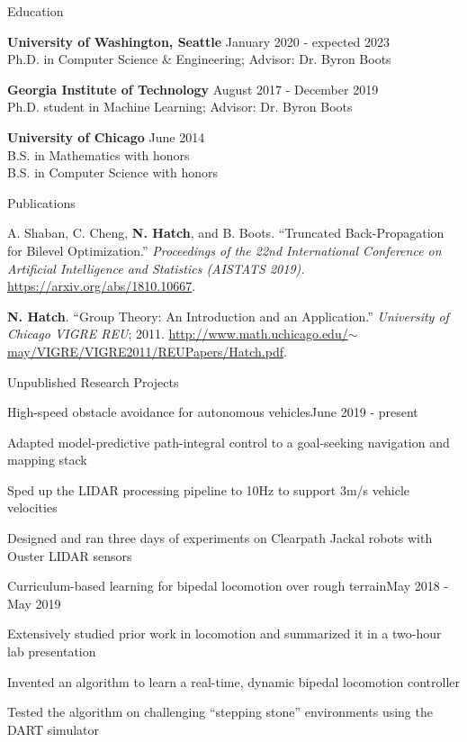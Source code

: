 \documentclass{resume} %
\begin{document}
\begin{rSection}{Education}

{\bf University of Washington, Seattle} \hfill {January 2020 - expected 2023} \\
Ph.D. in Computer Science \& Engineering; Advisor: Dr. Byron Boots

{\bf Georgia Institute of Technology} \hfill {August 2017 - December 2019} \\
Ph.D. student in Machine Learning; Advisor: Dr. Byron Boots

{\bf University of Chicago} \hfill {June 2014} \\
B.S. in Mathematics with honors \\
B.S. in Computer Science with honors

\end{rSection}

\begin{rSection}{Publications}

A. Shaban, C. Cheng, {\bf N. Hatch}, and B. Boots. ``Truncated Back-Propagation for Bilevel Optimization.''
{\em Proceedings of the 22nd International Conference on Artificial Intelligence and Statistics (AISTATS 2019).}
\href{https://arxiv.org/abs/1810.10667}{https://arxiv.org/abs/1810.10667}.

{\bf N. Hatch}. ``Group Theory: An Introduction and an Application.'' {\em University of Chicago VIGRE REU}; 2011.
\href{http://www.math.uchicago.edu/~may/VIGRE/VIGRE2011/REUPapers/Hatch.pdf}{http://www.math.uchicago.edu/$\sim$may/VIGRE/VIGRE2011/REUPapers/Hatch.pdf}.

\end{rSection}

\begin{rSection}{Unpublished Research Projects}

\begin{rProject}{High-speed obstacle avoidance for autonomous vehicles}{June 2019 - present}
\item Adapted model-predictive path-integral control to a goal-seeking navigation and mapping stack
\item Sped up the LIDAR processing pipeline to 10Hz to support 3m/s vehicle velocities
\item Designed and ran three days of experiments on Clearpath Jackal robots with Ouster LIDAR sensors
\end{rProject}

\begin{rProject}{Curriculum-based learning for bipedal locomotion over rough terrain}{May 2018 - May 2019}
\item Extensively studied prior work in locomotion and summarized it in a two-hour lab presentation
\item Invented an algorithm to learn a real-time, dynamic bipedal locomotion controller
\item Tested the algorithm on challenging ``stepping stone'' environments using the DART simulator
\end{rProject}

\end{rSection}
\end{document}
